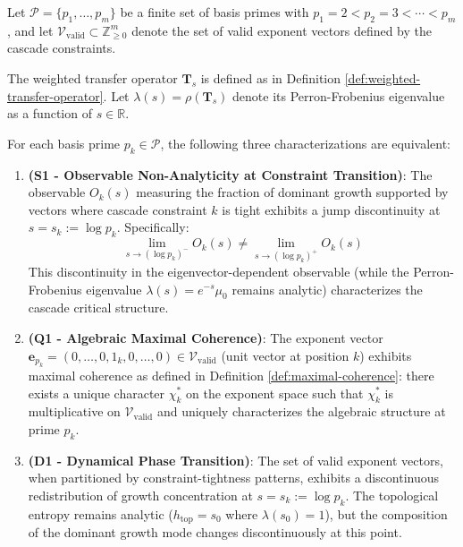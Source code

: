 \begin{theorem}
\label{thm:three-fold-spectral-rigorous}
Let $\mathcal{P} = \{p_1, \ldots, p_m\}$ be a finite set of basis primes with $p_1 = 2 < p_2 = 3 < \cdots < p_m$, and let $\mathcal{V}_{\text{valid}} \subset \mathbb{Z}_{\geq 0}^m$ denote the set of valid exponent vectors defined by the cascade constraints.

The weighted transfer operator $\mathbf{T}_s$ is defined as in Definition \ref{def:weighted-transfer-operator}. Let $\lambda(s) = \rho(\mathbf{T}_s)$ denote its Perron-Frobenius eigenvalue as a function of $s \in \mathbb{R}$.

For each basis prime $p_k \in \mathcal{P}$, the following three characterizations are equivalent:

\begin{enumerate}

\item \textbf{(S1 - Observable Non-Analyticity at Constraint Transition)}: The observable $O_k(s)$ measuring the fraction of dominant growth supported by vectors where cascade constraint $k$ is tight exhibits a jump discontinuity at $s = s_k := \log p_k$. Specifically:
\begin{equation}
\lim_{s \to (\log p_k)^-} O_k(s) \neq \lim_{s \to (\log p_k)^+} O_k(s)
\end{equation}
This discontinuity in the eigenvector-dependent observable (while the Perron-Frobenius eigenvalue $\lambda(s) = e^{-s}\mu_0$ remains analytic) characterizes the cascade critical structure.

\item \textbf{(Q1 - Algebraic Maximal Coherence)}: The exponent vector $\mathbf{e}_{p_k} = (0, \ldots, 0, 1_k, 0, \ldots, 0) \in \mathcal{V}_{\text{valid}}$ (unit vector at position $k$) exhibits maximal coherence as defined in Definition \ref{def:maximal-coherence}: there exists a unique character $\chi^*_k$ on the exponent space such that $\chi^*_k$ is multiplicative on $\mathcal{V}_{\text{valid}}$ and uniquely characterizes the algebraic structure at prime $p_k$.

\item \textbf{(D1 - Dynamical Phase Transition)}: The set of valid exponent vectors, when partitioned by constraint-tightness patterns, exhibits a discontinuous redistribution of growth concentration at $s = s_k := \log p_k$. The topological entropy remains analytic ($h_{\text{top}} = s_0$ where $\lambda(s_0) = 1$), but the composition of the dominant growth mode changes discontinuously at this point.


\end{enumerate}
\end{theorem}
